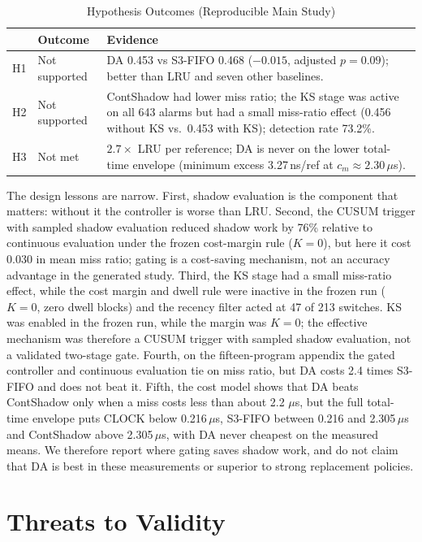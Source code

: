 \documentclass[10pt,twocolumn,a4paper]{IEEEtran}
\begin{document}
\begin{table}[!t]
\caption{Hypothesis Outcomes (Reproducible Main Study)}
\label{tab:hypotheses}
\footnotesize
\begin{tabular}{@{}p{}p{}p{}@{}}
\toprule
 & Outcome & Evidence \\
\midrule
H1 & Not supported & DA 0.453 vs S3-FIFO 0.468 ($-0.015$, adjusted $p = 0.09$); better than LRU and seven other baselines. \\
H2 & Not supported & ContShadow had lower miss ratio; the KS stage was active on all 643 alarms but had a small miss-ratio effect (0.456 without KS vs.\ 0.453 with KS); detection rate 73.2\%. \\
H3 & Not met & $2.7\times$ LRU per reference; DA is never on the lower total-time envelope (minimum excess 3.27\,ns/ref at $c_m\approx2.30\,\mu$s). \\
\bottomrule
\end{tabular}
\end{table}

The design lessons are narrow. First, shadow
evaluation is the component that matters: without it the controller is worse
than LRU. Second, the CUSUM trigger with sampled shadow evaluation reduced
shadow work by 76\% relative to continuous evaluation under the frozen cost-margin
rule ($K = 0$), but here it cost 0.030 in mean miss ratio; gating is a
cost-saving mechanism, not an accuracy advantage in the generated study. Third,
the KS stage had a small miss-ratio effect, while the cost margin and dwell
rule were inactive in the frozen run ($K = 0$, zero dwell blocks) and the
recency filter acted at 47 of 213 switches. KS was enabled in the frozen run,
while the margin was $K = 0$; the
effective mechanism was therefore a CUSUM trigger with sampled shadow
evaluation, not a validated two-stage gate. Fourth, on the fifteen-program
appendix the gated controller and continuous evaluation tie on miss ratio, but
DA costs 2.4 times S3-FIFO and does not beat it. Fifth, the cost model shows
that DA beats ContShadow only when a miss costs less than about 2.2 $\mu$s,
but the full total-time envelope puts CLOCK below 0.216\,$\mu$s, S3-FIFO
between 0.216 and 2.305\,$\mu$s and ContShadow above 2.305\,$\mu$s, with DA
never cheapest on the measured means. We therefore report where gating saves
shadow work, and do not claim that DA is best in these measurements or superior
to strong replacement policies.

\section{Threats to Validity}
\label{sec:threats}
\end{document}
